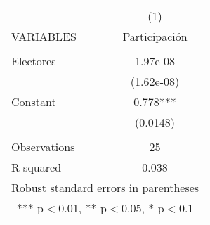 \documentclass[]{article}
\begin{document}
\begin{tabular}{lc} \hline
 & (1) \\
VARIABLES & Participación \\ \hline
 &  \\
Electores & 1.97e-08 \\
 & (1.62e-08) \\
Constant & 0.778*** \\
 & (0.0148) \\
 &  \\
Observations & 25 \\
 R-squared & 0.038 \\ \hline
\multicolumn{2}{c}{ Robust standard errors in parentheses} \\
\multicolumn{2}{c}{ *** p$<$0.01, ** p$<$0.05, * p$<$0.1} \\
\end{tabular}
\end{document}
